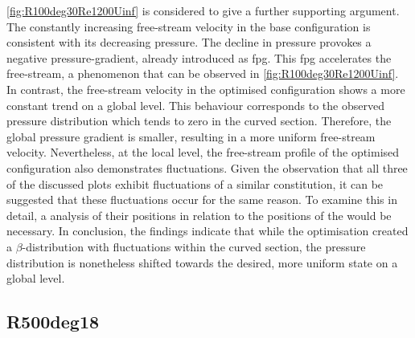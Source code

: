 \autoref{fig:R100deg30Re1200Uinf} is considered to give a further supporting argument.
The constantly increasing free-stream velocity in the base configuration is consistent with its decreasing pressure.
The decline in pressure provokes a negative pressure-gradient, already introduced as \acrshort{fpg}.
This \acrshort{fpg} accelerates  the free-stream, a phenomenon that can be observed  in \autoref{fig:R100deg30Re1200Uinf}.
In contrast, the free-stream velocity in the optimised configuration shows a more constant trend on a global level.
This behaviour corresponds to the observed pressure distribution which tends to zero in the curved section.
Therefore, the global pressure gradient is smaller, resulting in a more uniform free-stream velocity.
Nevertheless, at the local level, the free-stream profile of the optimised configuration also demonstrates fluctuations.
Given the observation that all three of the discussed plots exhibit fluctuations of a similar constitution, it can be suggested that these fluctuations occur for the same reason.
To examine this in detail, a  analysis of their positions in relation to the positions of the  would be necessary.
In conclusion, the findings indicate that while  the optimisation  created a $\beta$-distribution with fluctuations within the curved section, the pressure distribution is nonetheless shifted towards the desired, more uniform state on a global level.


\subsection{R500deg18}

